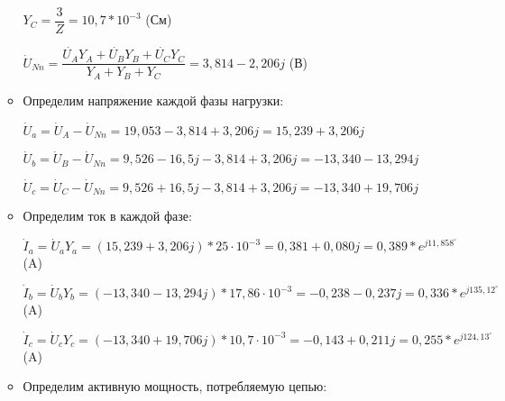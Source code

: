 \begin{enumerate}
\begin{itemize}
\begin{minipage}[h]{0.35\linewidth}
\vspace{2mm}

$ Y_{C} = \dfrac{3}{Z} = 10,7*10^{-3} $ (См) 

\end{minipage}

\begin{center}
$ \dot{U}_{Nn} = \dfrac{\dot{U_{A}}Y_{A} + \dot{U_{B}}Y_{B} + \dot{U_{C}}Y_{C}}{Y_{A} + Y_{B} + Y_{C} } = 3,814 - 2,206j $ (В)
\end{center}

\vspace{2mm}

\item Определим напряжение каждой фазы нагрузки:
\begin{center}

$ \dot{U}_{a} = \dot{U}_{A} - \dot{U}_{Nn} = 19,053 - 3,814 + 3,206j = 15,239 + 3,206j $

\vspace{2mm}

$ \dot{U}_{b} = \dot{U}_{B} - \dot{U}_{Nn} = 9,526 - 16,5j - 3,814 + 3,206j = -13,340 - 13,294j $

\vspace{2mm}

$ \dot{U}_{c} = \dot{U}_{C} - \dot{U}_{Nn} = 9,526 + 16,5j - 3,814 + 3,206j = -13,340 + 19,706j $

\end{center}

\item Определим ток в каждой фазе:
\begin{center}
$ \dot{I}_{a} = \dot{U}_{a}Y_{a} = (15,239 + 3,206j) * 25 \cdot 10^{-3} = 0,381 + 0,080j = 0,389 * e^{j11,858^{\circ}} $ (A) 

\vspace{2mm}

$ \dot{I}_{b} = \dot{U}_{b}Y_{b} = (-13,340 - 13,294j) * 17,86 \cdot 10^{-3} = -0,238 - 0,237j = 0,336 * e^{j135,12^{\circ}} $ (A) 

\vspace{2mm}

$ \dot{I}_{c} = \dot{U}_{c}Y_{c} = (-13,340 + 19,706j) * 10,7 \cdot 10^{-3} = -0,143 + 0,211j = 0,255 * e^{j124,13^{\circ}} $ (A) 
\end{center}

\vspace{2mm}

\item Определим активную мощность, потребляемую цепью:
\begin{center}


\end{center}
\end{itemize}
\end{enumerate}
